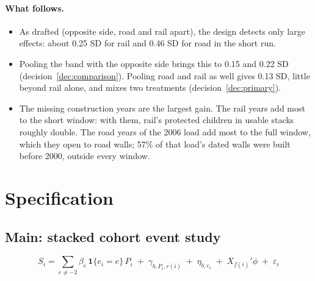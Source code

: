 \documentclass[11pt]{article}
\begin{document}
\paragraph{What follows.}
\begin{itemize}
\item As drafted (opposite side, road and rail apart), the design detects only large effects:
  about 0.25 SD for rail and 0.46 SD for road in the short run.
\item Pooling the band with the opposite side brings this to 0.15 and 0.22 SD
  (decision~\ref{dec:comparison}). Pooling road and rail as well gives 0.13 SD, little beyond
  rail alone, and mixes two treatments (decision~\ref{dec:primary}).
\item The missing construction years are the largest gain. The rail years add most to the short
  window: with them, rail's protected children in usable stacks roughly double. The road years
  of the 2006 load add most to the full window, which they open to road walls; 57\% of that
  load's dated walls were built before 2000, outside every window.
\end{itemize}

\section{Specification}\label{sec:spec}

\subsection{Main: stacked cohort event study}

\[
S_i = \sum_{e \neq -2} \beta_e \,\mathbf{1}\{e_i = e\}\, P_i \;+\; \gamma_{b, P_i, r(i)} \;+\; \eta_{b, e_i} \;+\; X_{f(i)}'\phi \;+\; \varepsilon_i
\]
\end{document}
